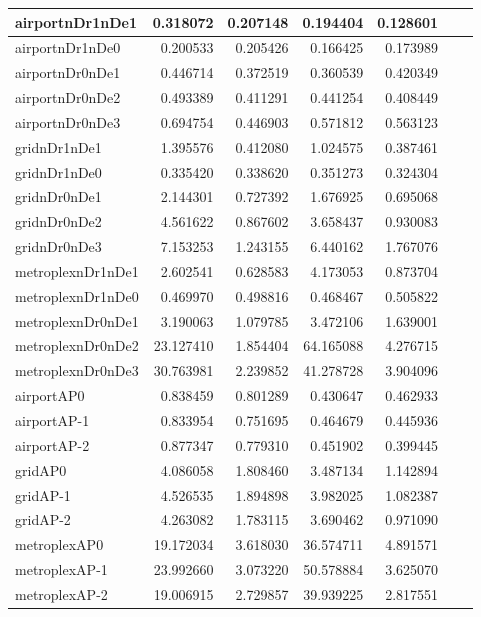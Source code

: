\begin{longtable}{|l|r|r|r|r|r|r|}
\endlastfoot
airportnDr1nDe1 & 0.318072 & 0.207148 & 0.194404 & 0.128601 \\ \hline
airportnDr1nDe0 & 0.200533 & 0.205426 & 0.166425 & 0.173989 \\ \hline
airportnDr0nDe1 & 0.446714 & 0.372519 & 0.360539 & 0.420349 \\ \hline
airportnDr0nDe2 & 0.493389 & 0.411291 & 0.441254 & 0.408449 \\ \hline
airportnDr0nDe3 & 0.694754 & 0.446903 & 0.571812 & 0.563123 \\ \hline
gridnDr1nDe1 & 1.395576 & 0.412080 & 1.024575 & 0.387461 \\ \hline
gridnDr1nDe0 & 0.335420 & 0.338620 & 0.351273 & 0.324304 \\ \hline
gridnDr0nDe1 & 2.144301 & 0.727392 & 1.676925 & 0.695068 \\ \hline
gridnDr0nDe2 & 4.561622 & 0.867602 & 3.658437 & 0.930083 \\ \hline
gridnDr0nDe3 & 7.153253 & 1.243155 & 6.440162 & 1.767076 \\ \hline
metroplexnDr1nDe1 & 2.602541 & 0.628583 & 4.173053 & 0.873704 \\ \hline
metroplexnDr1nDe0 & 0.469970 & 0.498816 & 0.468467 & 0.505822 \\ \hline
metroplexnDr0nDe1 & 3.190063 & 1.079785 & 3.472106 & 1.639001 \\ \hline
metroplexnDr0nDe2 & 23.127410 & 1.854404 & 64.165088 & 4.276715 \\ \hline
metroplexnDr0nDe3 & 30.763981 & 2.239852 & 41.278728 & 3.904096 \\ \hline
airportAP0 & 0.838459 & 0.801289 & 0.430647 & 0.462933 \\ \hline
airportAP-1 & 0.833954 & 0.751695 & 0.464679 & 0.445936 \\ \hline
airportAP-2 & 0.877347 & 0.779310 & 0.451902 & 0.399445 \\ \hline
gridAP0 & 4.086058 & 1.808460 & 3.487134 & 1.142894 \\ \hline
gridAP-1 & 4.526535 & 1.894898 & 3.982025 & 1.082387 \\ \hline
gridAP-2 & 4.263082 & 1.783115 & 3.690462 & 0.971090 \\ \hline
metroplexAP0 & 19.172034 & 3.618030 & 36.574711 & 4.891571 \\ \hline
metroplexAP-1 & 23.992660 & 3.073220 & 50.578884 & 3.625070 \\ \hline
metroplexAP-2 & 19.006915 & 2.729857 & 39.939225 & 2.817551 \\ \hline

\end{longtable}
